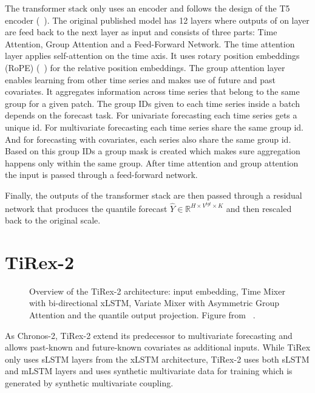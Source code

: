 The transformer stack only uses an encoder and follows the design of the T5 encoder (\citeauthor{t5encoder}~\cite{t5encoder}). The original published model has 12 layers where outputs of on layer are feed back to the next layer as input and consists of three parts: Time Attention, Group Attention and a Feed-Forward Network. The time attention layer applies self-attention on the time axis. It uses rotary position embeddings (RoPE) (\citeauthor{rotarypositions}~\cite{rotarypositions}) for the relative position embeddings. The group attention layer enables learning from other time series and makes use of future and past covariates. It aggregates information across time series that belong to the same group for a given patch. The group IDs given to each time series inside a batch depends on the forecast task. For univariate forecasting each time series gets a unique id. For multivariate forecasting each time series share the same group id. And for forecasting with covariates, each series also share the same group id. Based on this group IDs a group mask is created which makes sure aggregation happens only within the same group. After time attention and group attention the input is passed through a feed-forward network.

Finally, the outputs of the transformer stack are then passed through a residual network that produces the quantile forecast $\hat{Y} \in \mathbb{R}^{H \times V^{tgt} \times K}$ and then rescaled back to the original scale.


\section{TiRex-2}
\label{sec:foundationmodels:tirex}

\begin{figure}[htbp]
	\centering
	
	\caption[TiRex-2 architecture]{Overview of the TiRex-2 architecture:
		input embedding, Time Mixer with bi-directional xLSTM,
		Variate Mixer with Asymmetric Group Attention and the quantile output projection.
		Figure from \citeauthor{tirex2}~\cite{tirex2}.}
	\label{fig:tirex2}
\end{figure}

As Chronos-2, TiRex-2 extend its predecessor to multivariate forecasting and allows past-known and future-known covariates as additional inputs. While TiRex only uses sLSTM layers from the xLSTM architecture, TiRex-2 uses both sLSTM and mLSTM layers and uses synthetic multivariate data for training which is generated by synthetic multivariate coupling.

